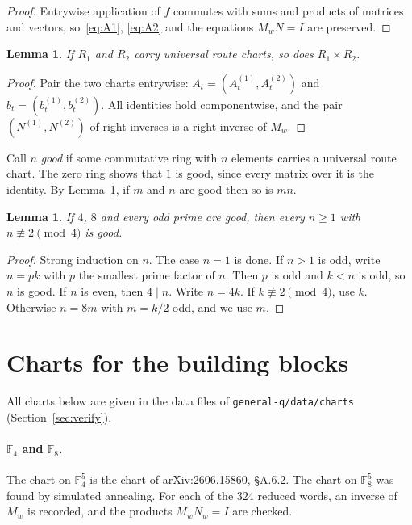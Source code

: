\documentclass[11pt]{article}
\newtheorem{lemma}[theorem]{Lemma}
\theoremstyle{definition}
\theoremstyle{remark}
\newcommand{\F}{\mathbb{F}}
\begin{document}
\begin{proof}
Entrywise application of $f$ commutes with sums and products of matrices and
vectors, so~\eqref{eq:A1}, \eqref{eq:A2} and the equations $M_wN=I$ are preserved.
\end{proof}

\begin{lemma}\label{lem:prod}
If $R_1$ and $R_2$ carry universal route charts, so does $R_1\times R_2$.
\end{lemma}

\begin{proof}
Pair the two charts entrywise: $A_t=(A_t^{(1)},A_t^{(2)})$ and
$b_t=(b_t^{(1)},b_t^{(2)})$. All identities hold componentwise, and the pair
$(N^{(1)},N^{(2)})$ of right inverses is a right inverse of $M_w$.
\end{proof}

Call $n$ \emph{good} if some commutative ring with $n$ elements carries a
universal route chart. The zero ring shows that $1$ is good, since every
matrix over it is the identity. By Lemma~\ref{lem:prod}, if $m$ and $n$ are
good then so is $mn$.

\begin{lemma}\label{lem:reduce}
If $4$, $8$ and every odd prime are good, then every $n\ge 1$ with
$n\not\equiv 2\pmod 4$ is good.
\end{lemma}

\begin{proof}
Strong induction on $n$. The case $n=1$ is done. If $n>1$ is odd, write
$n=pk$ with $p$ the smallest prime factor of $n$. Then $p$ is odd and $k<n$
is odd, so $n$ is good. If $n$ is even, then $4\mid n$. Write $n=4k$. If
$k\not\equiv 2\pmod 4$, use $k$. Otherwise $n=8m$ with $m=k/2$ odd, and we use $m$.
\end{proof}

\section{Charts for the building blocks}\label{sec:blocks}

All charts below are given in the data files of \texttt{general-q/data/charts}
(Section~\ref{sec:verify}).

\paragraph{$\F_4$ and $\F_8$.} The chart on $\F_4^5$ is the chart of
arXiv:2606.15860, \S A.6.2. The chart on $\F_8^5$ was found by simulated
annealing. For each of the $324$ reduced words, an inverse of $M_w$ is
recorded, and the products $M_wN_w=I$ are checked.
\end{document}
